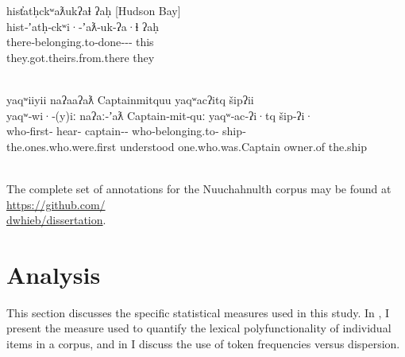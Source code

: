 \begin{exe}
  \glllll hist̓atḥckʷaƛukʔaɬ                                  ʔaḥ      [Hudson Bay]\\
  hist‑ʼatḥ‑ckʷi·‑ʼaƛ‑uk‑ʔa·ɬ                        ʔaḥ      ~\\
  there‑belonging.to‑done‑‑‑ this     ~\\
  they.got.theirs.from.there                         they     ~\\
                                             { }\\
  \vfix

  \glllll yaqʷiiyii               naʔaaʔaƛ      Captainmitquu                 yaqʷacʔitq                  šipʔii\\
  yaqʷ‑wi·‑(y)iː          naʔaː‑ʼaƛ     Captain‑mit‑quː               yaqʷ‑ac‑ʔi·tq               šip‑ʔi·\\
  who‑first‑  hear‑ captain‑‑ who‑belonging.to‑ ship‑\\
  the.ones.who.were.first understood    one.who.was.Captain           owner.of                    the.ship\\
                                                                \\
  \vfix

  \parencite[Kingfisher]{Louie2003}
  \renewcommand{\eachwordfive}{\rmfamily}

\end{exe}

The complete set of annotations for the Nuuchahnulth corpus may be found at \href{https://github.com/dwhieb/dissertation}{https://github.com/\\dwhieb/dissertation}.

\section{Analysis}
\label{sec:3.4}

This section discusses the specific statistical measures used in this study. In , I present the measure used to quantify the lexical polyfunctionality of individual items in a corpus, and in  I discuss the use of token frequencies versus dispersion.

